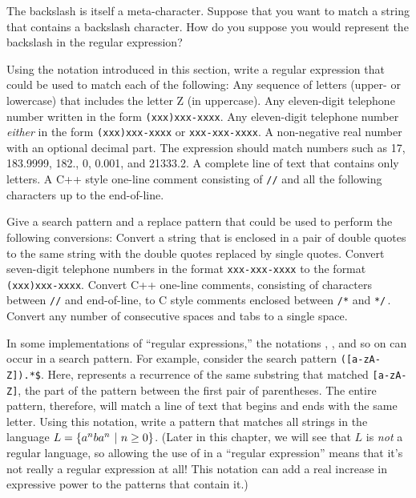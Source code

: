 \begin{exercises}

\problem The backslash is itself a meta-character.  Suppose that
you want to match a string that contains a backslash
character.  How do you suppose you would represent the backslash in
the regular expression?

\problem Using the notation introduced in this section,
write a regular expression that could be used to match
each of the following:
\ppart Any sequence of letters (upper- or lowercase) that
includes the letter Z (in uppercase).
\ppart Any eleven-digit telephone number written in the form
\texttt{(xxx)xxx-xxxx}.
\ppart Any eleven-digit telephone number \textit{either}
in the form \texttt{(xxx)xxx-xxxx} or \texttt{xxx-xxx-xxxx}.
\ppart A non-negative real number with an optional decimal
part.  The expression should match numbers such as
17, 183.9999, 182., 0, 0.001, and 21333.2.
\ppart A complete line of  text that contains only letters.
\ppart A C++ style one-line comment consisting of \texttt{//} and all the
following characters up to the end-of-line.

\problem Give a search pattern and a replace pattern that could
be used to perform the following conversions:
\ppart Convert a string that is enclosed in a pair of double quotes to
the same string with the double quotes replaced by single quotes.
\ppart Convert seven-digit telephone numbers in the format
\texttt{xxx-xxx-xxxx} to the format \texttt{(xxx)xxx-xxxx}.
\ppart Convert C++ one-line comments, consisting of characters
between \texttt{//} and end-of-line, to C style comments enclosed
between \texttt{/*} and \texttt{*/}$\,$.
\ppart Convert any number of consecutive spaces and tabs to
a single space.

\problem In some implementations of ``regular expressions,'' the
notations \texttt{}, \texttt{}, and so on can occur
in a search pattern.  For example, consider the search pattern
\texttt{\sol([a-zA-Z]).*\$}.  Here, \texttt{} represents
a recurrence of the same substring that matched \texttt{[a-zA-Z]},
the part of the pattern between the first pair of parentheses.
The entire pattern, therefore, will match a line of text that
begins and ends with the same letter.  Using this notation,
write a pattern that matches all strings in the language
$L=\{a^nba^n\,\,|\,\,n\ge0\}$.  (Later in this chapter, we will
see that $L$ is \textit{not} a regular language, so allowing the
use of \texttt{} in a ``regular expression'' means that it's
not really a regular expression at all!  This notation can add
a real increase in expressive power to the patterns that contain it.)

\end{exercises}



